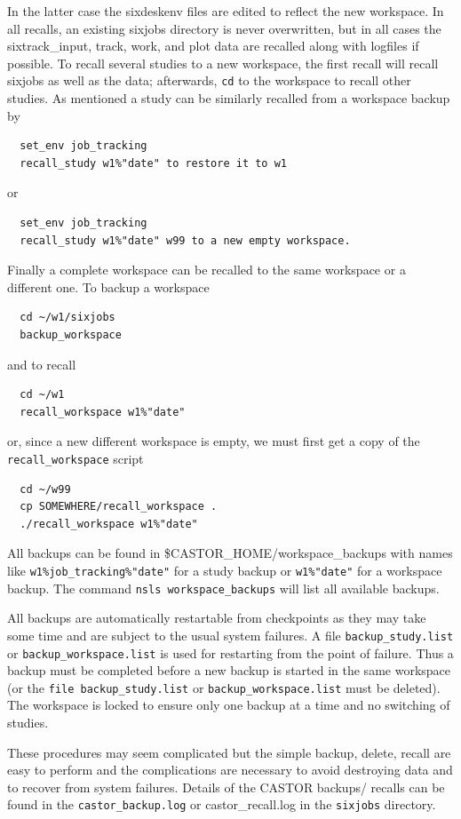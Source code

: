 \documentclass{article}    %
\begin{document}
In the latter case the sixdeskenv files are edited to reflect the new
workspace. In all recalls, an 
existing sixjobs directory is never overwritten, but in all cases the 
sixtrack\_input, track, work, and plot data are recalled along with 
logfiles if possible.
 To recall several studies to a new workspace, the first recall will
recall sixjobs as well as the data; afterwards, {\tt cd} to the workspace
to recall other studies.
 As mentioned a study can be similarly recalled from a workspace backup by
\begin{verbatim}
  set_env job_tracking
  recall_study w1%"date" to restore it to w1 
\end{verbatim}
or 
\begin{verbatim}
  set_env job_tracking
  recall_study w1%"date" w99 to a new empty workspace.
\end{verbatim}
 Finally a complete workspace can be recalled to the same workspace or a
different one.
To backup a workspace
\begin{verbatim} 
  cd ~/w1/sixjobs 
  backup_workspace
\end{verbatim}
and to recall
\begin{verbatim}
  cd ~/w1
  recall_workspace w1%"date"
\end{verbatim}
or, since a new different workspace is empty, we must first
get a copy of the {\tt recall\_workspace} script  
\begin{verbatim}
  cd ~/w99
  cp SOMEWHERE/recall_workspace .
  ./recall_workspace w1%"date"
\end{verbatim}

 All backups can be found in \$CASTOR\_HOME/workspace\_backups with names like
{\tt w1\%job\_tracking\%"date"} for a study backup
or
{\tt w1\%"date"} for a workspace backup.
The command {\tt nsls workspace\_backups} will list all available backups.

 All backups are automatically restartable from checkpoints as they may take
some time and are subject to the usual system failures. A file 
{\tt backup\_study.list} or {\tt backup\_workspace.list} is used for restarting
from the point of failure. Thus a backup must be completed before a new
backup is started in the same workspace (or the {\tt file backup\_study.list} or
{\tt backup\_workspace.list} must be deleted). The workspace is locked to ensure
only one backup at a time and no switching of studies.

 These procedures may seem complicated but the simple backup, delete, recall
are easy to perform and the complications are necessary to avoid destroying
data and to recover from system failures. Details of the CASTOR backups/
recalls can be found in the {\tt castor\_backup.log} or {castor\_recall.log}
in the {\tt sixjobs} directory.
\end{document}
